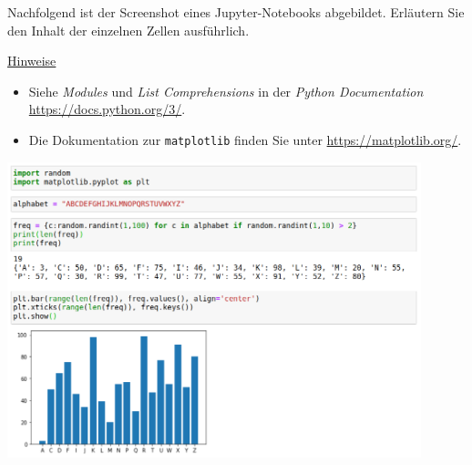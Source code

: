 \documentclass{uebungsblatt}
\begin{document}


\begin{aufgabe}
\medskip
Nachfolgend ist der Screenshot eines Jupyter-Notebooks abgebildet. Erläutern Sie den Inhalt der einzelnen Zellen ausführlich.

\underline{Hinweise}

\begin{itemize}
\item
Siehe \textit{Modules} und \textit{List Comprehensions} in der \textit{Python Documentation} \url{https://docs.python.org/3/}.
\item 
Die Dokumentation zur \texttt{matplotlib} finden Sie unter \url{https://matplotlib.org/}.
\end{itemize}

\includegraphics[width=0.9\textwidth]{plot.png}


\end{aufgabe}
\begin{loesung} 

\end{loesung}
\newpage
\end{document}

